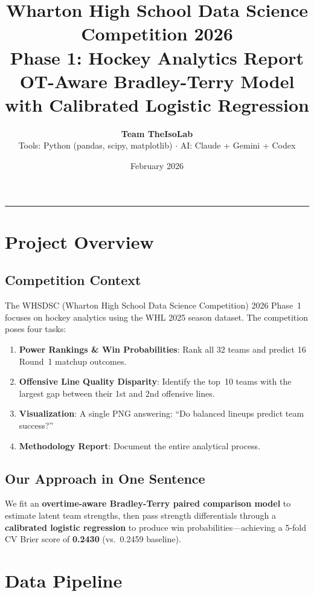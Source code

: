 \documentclass[11pt, a4paper]{article}
\title{%
    \vspace{-1cm}
    {\Large\textcolor{whartonblue}{Wharton High School Data Science Competition 2026}}\\[6pt]
    {\LARGE\textbf{Phase 1: Hockey Analytics Report}}\\[4pt]
    {\large OT-Aware Bradley-Terry Model with Calibrated Logistic Regression}
}
\author{%
    \textbf{Team TheIsoLab}\\[2pt]
    {\small Tools: Python (pandas, scipy, matplotlib) $\cdot$ AI: Claude + Gemini + Codex}
}
\date{\small February 2026}
\begin{document}
\maketitle
\thispagestyle{fancy}

\tableofcontents
\vspace{0.5cm}
\hrule
\vspace{0.5cm}

\section{Project Overview}
\label{sec:overview}

\subsection{Competition Context}
The WHSDSC (Wharton High School Data Science Competition) 2026 Phase~1 focuses on
hockey analytics using the WHL 2025 season dataset. The competition poses four tasks:

\begin{enumerate}[label=\textbf{(\alph*)}]
    \item \textbf{Power Rankings \& Win Probabilities}: Rank all 32 teams and predict 16 Round~1 matchup outcomes.
    \item \textbf{Offensive Line Quality Disparity}: Identify the top~10 teams with the largest gap between their 1st and 2nd offensive lines.
    \item \textbf{Visualization}: A single PNG answering: ``Do balanced lineups predict team success?''
    \item \textbf{Methodology Report}: Document the entire analytical process.
\end{enumerate}

\subsection{Our Approach in One Sentence}
We fit an \textbf{overtime-aware Bradley-Terry paired comparison model} to estimate latent team strengths, then pass strength differentials through a \textbf{calibrated logistic regression} to produce win probabilities---achieving a 5-fold CV Brier score of \textbf{0.2430} (vs.\ 0.2459 baseline).

\section{Data Pipeline}
\label{sec:data}
\end{document}
